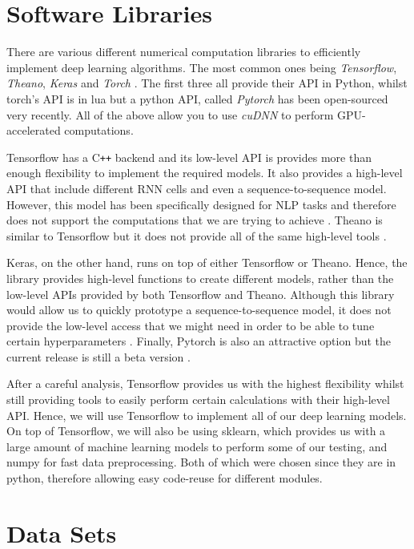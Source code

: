 \newpage

\section{Software Libraries}

There are various different numerical computation libraries to efficiently implement deep learning algorithms.
The most common ones being \textit{Tensorflow}, \textit{Theano}, \textit{Keras} and \textit{Torch} \cite{tensorflow,theano,keras,torch}.
The first three all provide their API in Python, whilst torch's API is in lua but a python API, called \textit{Pytorch} has been open-sourced very recently.
All of the above allow you to use \textit{cuDNN} to perform GPU-accelerated computations.

Tensorflow has a C\texttt{++} backend and its low-level API is provides more than enough flexibility to implement the required models.
It also provides a high-level API that include different RNN cells and even a sequence-to-sequence model.
However, this model has been specifically designed for NLP tasks and therefore does not support the computations that we are trying to achieve \cite{tensorflow}.
Theano is similar to Tensorflow but it does not provide all of the same high-level tools \cite{theano}.

Keras, on the other hand, runs on top of either Tensorflow or Theano.
Hence, the library provides high-level functions to create different models, rather than the low-level APIs provided by both Tensorflow and Theano.
Although this library would allow us to quickly prototype a sequence-to-sequence model, it does not provide the low-level access that we might need in order to be able to tune certain hyperparameters \cite{keras}.
Finally, Pytorch is also an attractive option but the current release is still a beta version \cite{torch}.

After a careful analysis, Tensorflow provides us with the highest flexibility whilst still providing tools to easily perform certain calculations with their high-level API.
Hence, we will use Tensorflow to implement all of our deep learning models.
On top of Tensorflow, we will also be using sklearn, which provides us with a large amount of machine learning models to perform some of our testing, and numpy for fast data preprocessing.
Both of which were chosen since they are in python, therefore allowing easy code-reuse for different modules.

\section{Data Sets}

